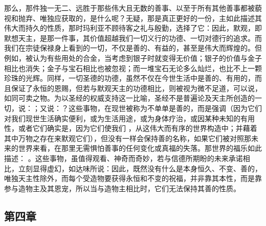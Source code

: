 那么，那件独一无二、远胜于那些伟大且无数的善事、以至于所有其他善事都被藐视和抛弃、唯独应获取的，是什么呢？无疑，那是真正更好的一份，主如此描述其伟大而持久的性质，那时玛利亚不顾待客之礼与殷勤，选择了它：因此，默观，即默想天主，是那一件事，其价值超越我们一切义行的功德、一切对德行的追求。而我们在宗徒保禄身上看到的一切，不仅是善的、有益的，甚至是伟大而辉煌的。但例如，被认为有些用处的合金，当考虑到银子时就变得无价值；银子的价值与金子相比也消失；金子与宝石相比也被忽视；而一堆宝石无论多么灿烂，也比不上一颗珍珠的光辉。同样，一切圣德的功德，虽然不仅在今世生活中是善的、有用的，而且保证了永恒的恩赐，但若与默观天主的功德相比，则被视为微不足道，可以说，如同可卖之物。为以圣经的权威支持这一比喻，圣经不是普遍论及天主所创造的一切，说：；又说：？这些事物，在现世被称为不单单是善的，而是强调（因为它们对我们现世生活确实便利，或为生活用途，或为身体疗治，或因某种未知的有用性，或者它们确实是，因为它们使我们 ，从这伟大而有序的世界构造中；并藉着其中万物之存在来默观它们），但没有一样会保持善的名称，如果它们被对照那未来的世界来看，在那里无需惧怕善事的任何变化或真福的失落。那世界的福乐如此描述： 。这些事物，虽值得观看、神奇而奇妙，若与信德所期盼的未来承诺相比，立刻显得虚幻，如达味所说：因此，既然没有什么是本身恒久、不变、善的，唯独天主性除外，而每个受造物要获得永恒和不变的祝福，并非靠其本性，而是靠参与造物主及其恩宠，所以当与造物主相比时，它们无法保持其善的性质。\par


\subsection{第四章}

\par

